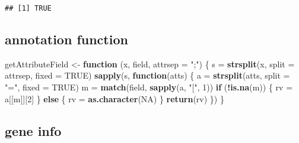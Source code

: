 \documentclass[]{article}
\newenvironment{Shaded}{\begin{snugshade}}{\end{snugshade}}
\newcommand{\ControlFlowTok}[1]{\textcolor[rgb]{0.13,0.29,0.53}{\textbf{#1}}}
\newcommand{\DataTypeTok}[1]{\textcolor[rgb]{0.13,0.29,0.53}{#1}}
\newcommand{\DecValTok}[1]{\textcolor[rgb]{0.00,0.00,0.81}{#1}}
\newcommand{\KeywordTok}[1]{\textcolor[rgb]{0.13,0.29,0.53}{\textbf{#1}}}
\newcommand{\NormalTok}[1]{#1}
\newcommand{\OperatorTok}[1]{\textcolor[rgb]{0.81,0.36,0.00}{\textbf{#1}}}
\newcommand{\OtherTok}[1]{\textcolor[rgb]{0.56,0.35,0.01}{#1}}
\newcommand{\StringTok}[1]{\textcolor[rgb]{0.31,0.60,0.02}{#1}}
\begin{document}
\begin{verbatim}
## [1] TRUE
\end{verbatim}

\hypertarget{annotation-function}{%
\subsection{annotation function}\label{annotation-function}}

\begin{Shaded}
\begin{Highlighting}[]
\NormalTok{getAttributeField <-}\StringTok{ }\ControlFlowTok{function}\NormalTok{ (x, field, }\DataTypeTok{attrsep =} \StringTok{";"}\NormalTok{) \{}
\NormalTok{                      s =}\StringTok{ }\KeywordTok{strsplit}\NormalTok{(x, }\DataTypeTok{split =}\NormalTok{ attrsep, }\DataTypeTok{fixed =} \OtherTok{TRUE}\NormalTok{)}
                      \KeywordTok{sapply}\NormalTok{(s, }\ControlFlowTok{function}\NormalTok{(atts) \{}
\NormalTok{                        a =}\StringTok{ }\KeywordTok{strsplit}\NormalTok{(atts, }\DataTypeTok{split =} \StringTok{"="}\NormalTok{, }\DataTypeTok{fixed =} \OtherTok{TRUE}\NormalTok{)}
\NormalTok{                        m =}\StringTok{ }\KeywordTok{match}\NormalTok{(field, }\KeywordTok{sapply}\NormalTok{(a, }\StringTok{"["}\NormalTok{, }\DecValTok{1}\NormalTok{))}
                        \ControlFlowTok{if}\NormalTok{ (}\OperatorTok{!}\KeywordTok{is.na}\NormalTok{(m)) \{}
\NormalTok{                          rv =}\StringTok{ }\NormalTok{a[[m]][}\DecValTok{2}\NormalTok{]}
\NormalTok{                        \}}
                        \ControlFlowTok{else}\NormalTok{ \{}
\NormalTok{                          rv =}\StringTok{ }\KeywordTok{as.character}\NormalTok{(}\OtherTok{NA}\NormalTok{)}
\NormalTok{                        \}}
                        \KeywordTok{return}\NormalTok{(rv)}
\NormalTok{                      \})}
\NormalTok{                    \}}
\end{Highlighting}
\end{Shaded}

\hypertarget{gene-info}{%
\subsection{gene info}\label{gene-info}}
\end{document}
